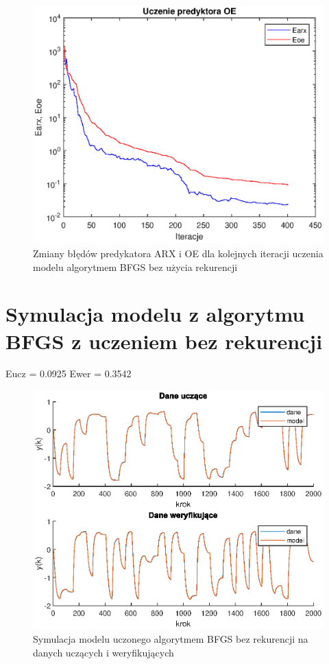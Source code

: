 		\begin{figure}[h!]
			\centering
			\includegraphics[width=\linewidth]{img/BFGS_ARX_p.eps}
			\caption{Zmiany błędów predykatora ARX i OE dla kolejnych iteracji uczenia modelu algorytmem BFGS bez użycia rekurencji}
			\label{fig:bfgs_arx_p}
		\end{figure}
		
		\newpage
	\section{Symulacja modelu z algorytmu BFGS z uczeniem bez rekurencji}
		\label{sec:bfgs_arx_sym}
		Eucz = 0.0925
		Ewer = 0.3542
		
		\begin{figure}[h!]
			\centering
			\includegraphics[width=\linewidth]{img/BFGS_ARX_d.eps}
			\caption{Symulacja modelu uczonego algorytmem BFGS bez rekurencji na danych uczących i weryfikujących}
			\label{fig:bfgs_arx_d}
		\end{figure}
		
